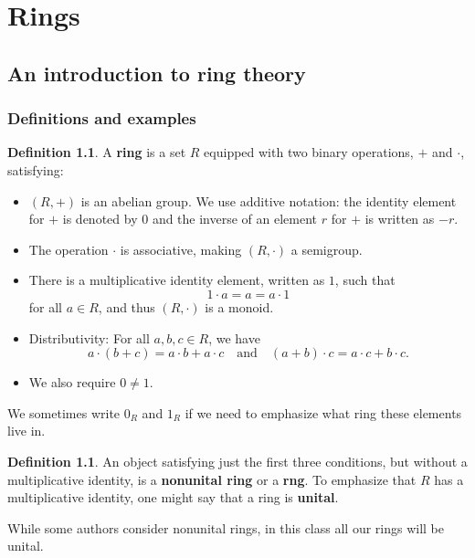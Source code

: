 \documentclass[12pt]{report}
\numberwithin{equation}{section}
\numberwithin{theorem}{chapter}
\theoremstyle{definition}
\newtheorem{definition}[theorem]{Definition}
\newtheorem*{basic properties}{Basic Properties}
\newtheorem*{Important Remark}{Important Remark}
\newcommand{\df}[1]{{\bf #1}\index{#1}}
\begin{document}
\part{Rings}

\chapter{An introduction to ring theory}


\section{Definitions and examples}

\begin{definition} 
A \df{ring} is a set $R$ equipped with two binary operations, $+$ and $\cdot$, satisfying:
\begin{itemize}[itemsep=-0.2em]
\item $(R,+)$ is an abelian group. We use additive notation: the identity element for $+$ is denoted by $0$ and the inverse of an element $r$ for $+$ is written as $-r$. 
\item The operation $\cdot$ is associative, making $(R,\cdot)$ a semigroup.
\item There is a multiplicative identity element, written as $1$, such that 
$$1 \cdot a = a = a \cdot 1$$ 
for all $a \in R$, and thus $(R, \cdot)$ is a monoid.

\item Distributivity: For all $a,b,c \in R$, we have 
$$a \cdot (b + c) = a \cdot b + a \cdot c \quad \text{and} \quad (a + b) \cdot c = a \cdot c + b \cdot c.$$
\item We also require $0 \neq 1$.
\end{itemize}
\end{definition}

We sometimes write $0_R$ and $1_R$ if we need to emphasize what ring these elements live in.%

\begin{definition}
An object satisfying just the first three conditions, but without a multiplicative identity, is a {\bf nonunital ring}  or a {\bf rng}. To emphasize that $R$ has a multiplicative identity, one might say that a ring is {\bf unital}. 
\end{definition}
 

While some authors consider nonunital rings, in this class all our rings will be unital.
\end{document}

